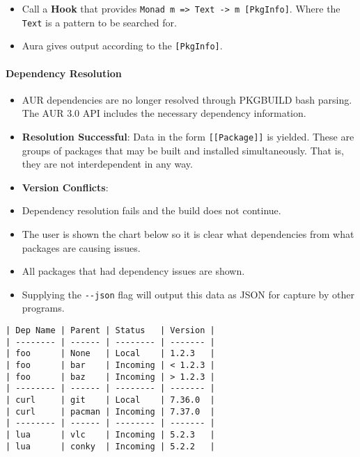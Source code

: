 \documentclass{article}
\begin{document}
\begin{itemize}
  \begin{itemize}
  \itemsep1pt\parskip0pt
  \item
    Call a \textbf{Hook} that provides
    \texttt{Monad m =\textgreater{} Text -\textgreater{} m {[}PkgInfo{]}}.
    Where the \texttt{Text} is a pattern to be searched for.
  \item
    Aura gives output according to the \texttt{{[}PkgInfo{]}}.
  \end{itemize}
\end{itemize}

\paragraph{Dependency Resolution}\label{dependency-resolution}

\begin{itemize}
\itemsep1pt\parskip0pt
\item
  AUR dependencies are no longer resolved through PKGBUILD bash parsing.
  The AUR 3.0 API includes the necessary dependency information.
\item
  \textbf{Resolution Successful}: Data in the form
  \texttt{{[}{[}Package{]}{]}} is yielded. These are groups of packages
  that may be built and installed simultaneously. That is, they are not
  interdependent in any way.
\item
  \textbf{Version Conflicts}:
\item
  Dependency resolution fails and the build does not continue.
\item
  The user is shown the chart below so it is clear what dependencies
  from what packages are causing issues.
\item
  All packages that had dependency issues are shown.
\item
  Supplying the \texttt{-\/-json} flag will output this data as JSON for
  capture by other programs.
\end{itemize}

\begin{verbatim}
| Dep Name | Parent | Status   | Version |
| -------- | ------ | -------- | ------- |
| foo      | None   | Local    | 1.2.3   |
| foo      | bar    | Incoming | < 1.2.3 |
| foo      | baz    | Incoming | > 1.2.3 |
| -------- | ------ | -------- | ------- |
| curl     | git    | Local    | 7.36.0  |
| curl     | pacman | Incoming | 7.37.0  |
| -------- | ------ | -------- | ------- |
| lua      | vlc    | Incoming | 5.2.3   |
| lua      | conky  | Incoming | 5.2.2   |
\end{verbatim}
\end{document}
